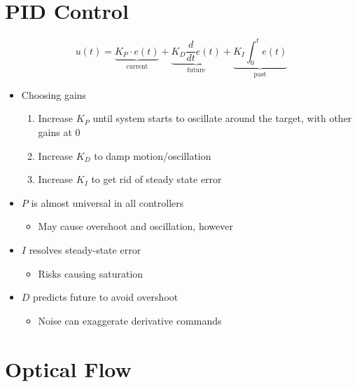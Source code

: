 \documentclass{article}
\begin{document}
\section*{PID Control}

\begin{equation*}
u(t)=\underbrace{K_P\cdot e(t)}_\text{current} + \underbrace{K_D \frac{d}{dt}e (t)}_\text{future}+\underbrace{K_I \int_0^t e(t)}_\text{past}
\end{equation*}
\begin{itemize}
\item Choosing gains
\begin{enumerate}
\item Increase $K_P$ until system starts to oscillate around the target, with other gains at $0$
\item Increase $K_D$ to damp motion/oscillation
\item Increase $K_I$ to get rid of steady state error
\end{enumerate}
\item $P$ is almost universal in all controllers
\begin{itemize}
\item May cause overshoot and oscillation, however
\end{itemize}
\item $I$ resolves steady-state error
\begin{itemize}
\item Risks causing saturation
\end{itemize}
\end{itemize}
\begin{itemize}
\item $D$ predicts future to avoid overshoot
\begin{itemize}
\item Noise can exaggerate derivative commands
\end{itemize}
\end{itemize}

\section*{Optical Flow}
\end{document}
